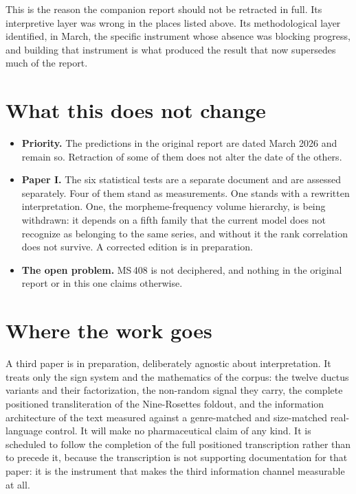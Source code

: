 \documentclass[11pt,a4paper]{article}
\begin{document}
This is the reason the companion report should not be retracted in full. Its interpretive layer was
wrong in the places listed above. Its methodological layer identified, in March, the specific
instrument whose absence was blocking progress, and building that instrument is what produced the
result that now supersedes much of the report.

\section{What this does not change}

\begin{itemize}[leftmargin=1.4em]
\item \textbf{Priority.} The predictions in the original report are dated March 2026 and remain so.
Retraction of some of them does not alter the date of the others.
\item \textbf{Paper I.} The six statistical tests are a separate document and are assessed
separately. Four of them stand as measurements. One stands with a rewritten interpretation. One,
the morpheme-frequency volume hierarchy, is being withdrawn: it depends on a fifth family that the
current model does not recognize as belonging to the same series, and without it the rank
correlation does not survive. A corrected edition is in preparation.
\item \textbf{The open problem.} MS\,408 is not deciphered, and nothing in the original report or
in this one claims otherwise.
\end{itemize}

\section{Where the work goes}

A third paper is in preparation, deliberately agnostic about interpretation. It treats only the
sign system and the mathematics of the corpus: the twelve ductus variants and their factorization,
the non-random signal they carry, the complete positioned transliteration of the Nine-Rosettes
foldout, and the information architecture of the text measured against a genre-matched and
size-matched real-language control. It will make no pharmaceutical claim of any kind. It is
scheduled to follow the completion of the full positioned transcription rather than to precede it,
because the transcription is not supporting documentation for that paper: it is the instrument that
makes the third information channel measurable at all.
\end{document}

